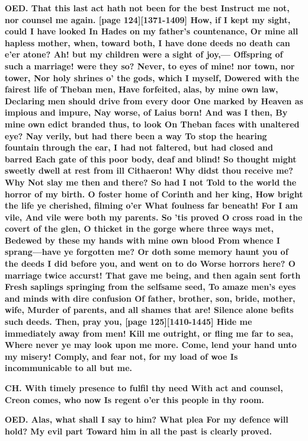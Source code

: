\documentclass[11pt,letter]{book}
\begin{document}
\par \textbf{OED. That this last act hath not been for the best Instruct me not, nor counsel me again. [page 124][1371-1409] How, if I kept my sight, could I have looked In Hades on my father’s countenance, Or mine all hapless mother, when, toward both, I have done deeds no death can e’er atone? Ah! but my children were a sight of joy,— Offspring of such a marriage! were they so? Never, to eyes of mine! nor town, nor tower, Nor holy shrines o’ the gods, which I myself, Dowered with the fairest life of Theban men, Have forfeited, alas, by mine own law, Declaring men should drive from every door One marked by Heaven as impious and impure, Nay worse, of Laius born! And was I then, By mine own edict branded thus, to look On Theban faces with unaltered eye? Nay verily, but had there been a way To stop the hearing fountain through the ear, I had not faltered, but had closed and barred Each gate of this poor body, deaf and blind! So thought might sweetly dwell at rest from ill Cithaeron! Why didst thou receive me? Why Not slay me then and there? So had I not Told to the world the horror of my birth. O foster home of Corinth and her king, How bright the life ye cherished, filming o’er What foulness far beneath! For I am vile, And vile were both my parents. So ’tis proved O cross road in the covert of the glen, O thicket in the gorge where three ways met, Bedewed by these my hands with mine own blood From whence I sprang—have ye forgotten me? Or doth some memory haunt you of the deeds I did before you, and went on to do Worse horrors here? O marriage twice accurst! That gave me being, and then again sent forth Fresh saplings springing from the selfsame seed, To amaze men’s eyes and minds with dire confusion Of father, brother, son, bride, mother, wife, Murder of parents, and all shames that are! Silence alone befits such deeds. Then, pray you, [page 125][1410-1445] Hide me immediately away from men! Kill me outright, or fling me far to sea, Where never ye may look upon me more. Come, lend your hand unto my misery! Comply, and fear not, for my load of woe Is incommunicable to all but me.}
\par 

\par \textbf{CH. With timely presence to fulfil thy need With act and counsel, Creon comes, who now Is regent o’er this people in thy room.}
\par 

\par \textbf{OED. Alas, what shall I say to him? What plea For my defence will hold? My evil part Toward him in all the past is clearly proved.}
\par 
\end{document}
